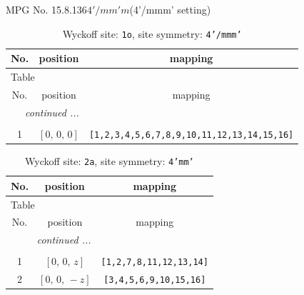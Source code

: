 \documentclass[fleqn,8pt]{jsarticle}
\begin{document}
\setcounter{MaxMatrixCols}{32}

\renewcommand{\tablename}{Table~}
\renewcommand{\figurename}{Figure~}
\begin{center}
\LARGE
MPG No. 15.8.136\quad$4'/mm'm$\quad(4'/mmm' setting)
\end{center}
\renewcommand{\arraystretch}{1.2}
\begin{longtable}{ccc}
\caption{Wyckoff site: {\tt 1o}, site symmetry: {\tt 4'/mmm'}}
 \\
 \hline \hline
No. & position & mapping \\ \hline \endfirsthead

\multicolumn{2}{l}{\tablename\ \thetable{}} \\
 \hline \hline
No. & position & mapping \\ \hline \endhead

 \hline \hline
\multicolumn{2}{r}{\footnotesize\it continued ...} \\ \endfoot

 \hline \hline
\multicolumn{2}{r}{} \\ \endlastfoot

1 & $\left[ 0,\, 0,\, 0 \right]$ & {\tt [1,2,3,4,5,6,7,8,9,10,11,12,13,14,15,16]} \\
\end{longtable}
\renewcommand{\arraystretch}{1.2}
\begin{longtable}{ccc}
\caption{Wyckoff site: {\tt 2a}, site symmetry: {\tt 4'mm'}}
 \\
 \hline \hline
No. & position & mapping \\ \hline \endfirsthead

\multicolumn{2}{l}{\tablename\ \thetable{}} \\
 \hline \hline
No. & position & mapping \\ \hline \endhead

 \hline \hline
\multicolumn{2}{r}{\footnotesize\it continued ...} \\ \endfoot

 \hline \hline
\multicolumn{2}{r}{} \\ \endlastfoot

1 & $\left[ 0,\, 0,\, z \right]$ & {\tt [1,2,7,8,11,12,13,14]} \\ \hline
2 & $\left[ 0,\, 0,\, - z \right]$ & {\tt [3,4,5,6,9,10,15,16]} \\
\end{longtable}
\renewcommand{\arraystretch}{1.2}
\end{document}
